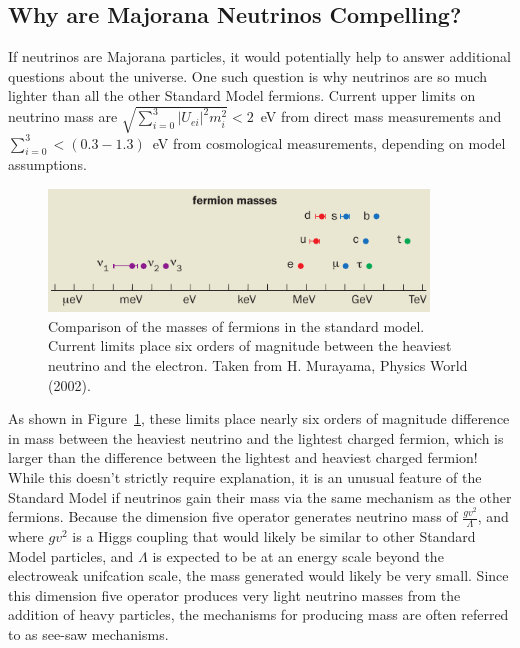\documentclass[/main.tex]{subfiles}
\begin{document}
\subsection{Why are Majorana Neutrinos Compelling?} \label{sec:implications}
If neutrinos are Majorana particles, it would potentially help to answer additional questions about the universe.
One such question is why neutrinos are so much lighter than all the other Standard Model fermions.
Current upper limits on neutrino mass are $\sqrt{\sum_{i=0}^{3}|U_{ei}|^2m_i^2}<2$~eV from direct mass measurements and $\sum_{i=0}^3<(0.3-1.3)$~eV from cosmological measurements, depending on model assumptions\cite{PDG2018}.
\begin{figure}[t]
  \centering
  \includegraphics[width=0.9\textwidth]{numasssmall}
  \caption[Mass of Standard Model Fermions]{\label{fig:SMfermionmasses}
    Comparison of the masses of fermions in the standard model. Current limits place six orders of magnitude between the heaviest neutrino and the electron. Taken from H. Murayama, Physics World (2002).
  }
\end{figure}
As shown in Figure~\ref{fig:SMfermionmasses}, these limits place nearly six orders of magnitude difference in mass between the heaviest neutrino and the lightest charged fermion, which is larger than the difference between the lightest and heaviest charged fermion!
While this doesn't strictly require explanation, it is an unusual feature of the Standard Model if neutrinos gain their mass via the same mechanism as the other fermions.
Because the dimension five operator generates neutrino mass of $\frac{gv^2}{\Lambda}$, and where $gv^2$ is a Higgs coupling that would likely be similar to other Standard Model particles, and $\Lambda$ is expected to be at an energy scale beyond the electroweak unifcation scale, the mass generated would likely be very small.
Since this dimension five operator produces very light neutrino masses from the addition of heavy particles, the mechanisms for producing mass are often referred to as see-saw mechanisms.
\end{document}
